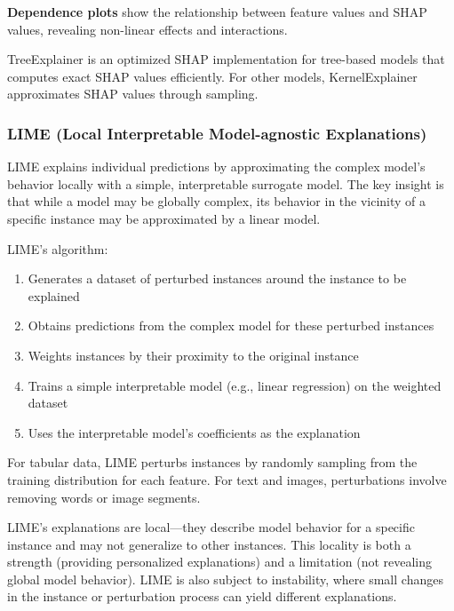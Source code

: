 \textbf{Dependence plots} show the relationship between feature values and SHAP values, revealing non-linear effects and interactions.

TreeExplainer is an optimized SHAP implementation for tree-based models that computes exact SHAP values efficiently. For other models, KernelExplainer approximates SHAP values through sampling.


\subsubsection{LIME (Local Interpretable Model-agnostic Explanations)}

LIME explains individual predictions by approximating the complex model's behavior locally with a simple, interpretable surrogate model. The key insight is that while a model may be globally complex, its behavior in the vicinity of a specific instance may be approximated by a linear model.

LIME's algorithm:
\begin{enumerate}
    \item Generates a dataset of perturbed instances around the instance to be explained
    \item Obtains predictions from the complex model for these perturbed instances
    \item Weights instances by their proximity to the original instance
    \item Trains a simple interpretable model (e.g., linear regression) on the weighted dataset
    \item Uses the interpretable model's coefficients as the explanation
\end{enumerate}

For tabular data, LIME perturbs instances by randomly sampling from the training distribution for each feature. For text and images, perturbations involve removing words or image segments.

LIME's explanations are local—they describe model behavior for a specific instance and may not generalize to other instances. This locality is both a strength (providing personalized explanations) and a limitation (not revealing global model behavior). LIME is also subject to instability, where small changes in the instance or perturbation process can yield different explanations.


